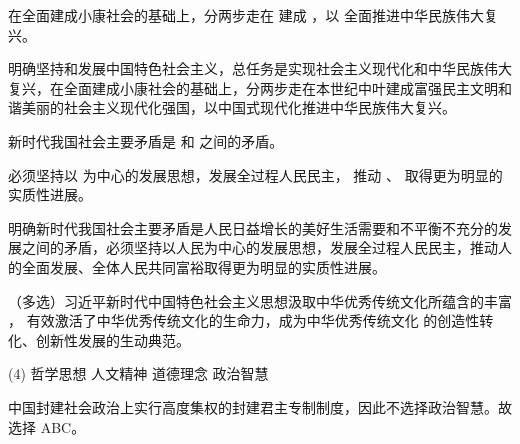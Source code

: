 \documentclass[UTF8,10pt]{ctexbook} %
\begin{document}
\begin{example}
    在全面建成小康社会的基础上，分两步走在 \underline{\qquad \qquad \qquad} 建成
    \underline{\qquad \qquad \qquad \qquad \qquad}，以 \underline{\qquad \qquad \qquad}
    全面推进中华民族伟大复兴。
\end{example}

\begin{remark}
    明确坚持和发展中国特色社会主义，总任务是实现社会主义现代化和中华民族伟大复兴，在全面建成小康社会的基础上，分两步走在本世纪中叶建成富强民主文明和谐美丽的社会主义现代化强国，以中国式现代化推进中华民族伟大复兴。
\end{remark}

\begin{example}
    新时代我国社会主要矛盾是 \underline{\qquad \qquad \qquad \qquad} 和
    \underline{\qquad \qquad \qquad \qquad} 之间的矛盾。
\end{example}

\begin{example}
    必须坚持以 \underline{\qquad \qquad \qquad} 为中心的发展思想，发展全过程人民民主，
    推动 \underline{\qquad \qquad \qquad}、\underline{\qquad \qquad \qquad} 取得更为明显的实质性进展。
\end{example}

\begin{remark}
    明确新时代我国社会主要矛盾是人民日益增长的美好生活需要和不平衡不充分的发展之间的矛盾，必须坚持以人民为中心的发展思想，发展全过程人民民主，推动人的全面发展、全体人民共同富裕取得更为明显的实质性进展。
\end{remark}

\begin{example}
    （多选）习近平新时代中国特色社会主义思想汲取中华优秀传统文化所蕴含的丰富 
    \underline{\qquad \qquad \qquad \qquad}，
    有效激活了中华优秀传统文化的生命力，成为中华优秀传统文化
    的创造性转化、创新性发展的生动典范。
    \begin{tasks}[label={\Alph*. }](4)
        \task 哲学思想
        \task 人文精神
        \task 道德理念
        \task 政治智慧
    \end{tasks}
    \begin{remark}
        中国封建社会政治上实行高度集权的封建君主专制制度，因此不选择政治智慧。故选择 ABC。
    \end{remark}
\end{example}



\newpage
\thispagestyle{empty}
\end{document}
